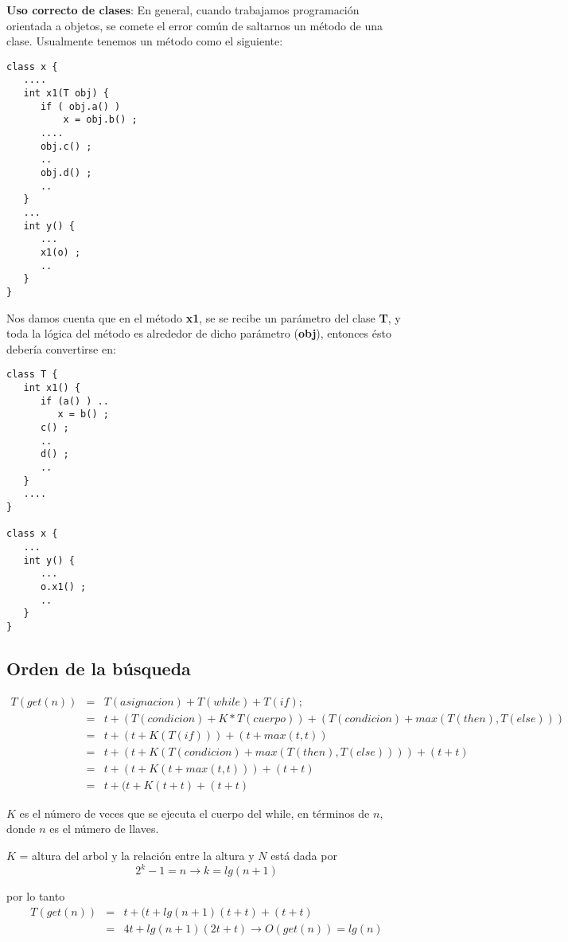 \textbf{Uso correcto de clases}: En general, cuando trabajamos
programación orientada a objetos, se comete el error común de
saltarnos un método de una clase.  Usualmente tenemos un método como
el siguiente:
\begin{verbatim}
class x {
   ....
   int x1(T obj) {
      if ( obj.a() )
          x = obj.b() ;
      ....
      obj.c() ;
      ..
      obj.d() ;
      ..
   }
   ...
   int y() {
      ...
      x1(o) ;
      ..
   }
} 
\end{verbatim}

Nos damos cuenta que en el método \textbf{x1}, se se recibe un
parámetro del clase \textbf{T}, y toda la lógica del método es
alrededor de dicho parámetro (\textbf{obj}), entonces ésto debería
convertirse en:
\begin{verbatim}
class T {
   int x1() {
      if (a() ) ..
         x = b() ;
      c() ;
      ..
      d() ;
      ..
   }
   ....
}

class x {
   ...
   int y() {
      ...
      o.x1() ;
      ..
   }
}
\end{verbatim}

\subsection{Orden de la búsqueda}
\label{sec:orden-de-la}

\begin{eqnarray*}
  \label{eq:1}
  T(get(n)) &=& T(asignacion) + T(while) + T(if) ;\\
    &=& t + ( T(condicion) + K * T(cuerpo) ) + ( T(condicion) + max ( T(then) , T(else) )  )\\
    &=& t + ( t + K ( T(if) ) ) + ( t + max ( t, t ) ) \\
    &=& t + ( t + K ( T(condicion) + max ( T(then) , T(else) )) ) + ( t +  t ) \\
    &=& t + ( t + K ( t + max ( t , t )) ) + ( t +  t ) \\
    &=& t + ( t + K ( t + t ) + ( t +  t ) 
\end{eqnarray*}

$K$ es el número de veces que se ejecuta el cuerpo del while, en
términos de $n$, donde $n$ es el número de llaves.

$K$ = altura del arbol y la relación entre la altura y $N$ está dada por  
\[ 2^k - 1 = n  \longrightarrow   k = lg ( n + 1)\]

por lo tanto
\begin{eqnarray*}
  \label{eq:2}
  T(get(n)) &=&  t + ( t + lg ( n + 1) ( t + t ) + ( t +  t ) \\
    &=& 4t + lg ( n + 1) ( 2t + t ) \longrightarrow O(get(n)) = lg(n) 
\end{eqnarray*}

